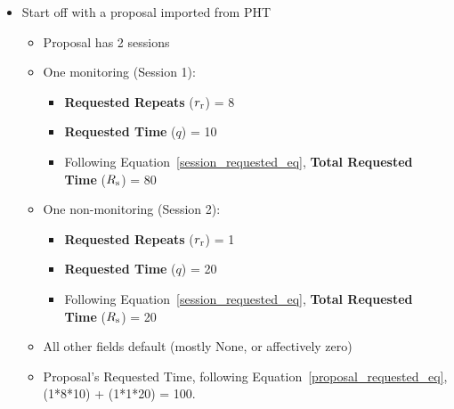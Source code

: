\documentclass{article}
\begin{document}
\begin{itemize}
\item Start off with a proposal imported from PHT
    \begin{itemize}
    \item Proposal has 2 sessions
    \item One monitoring (Session 1): 
        \begin{itemize}
        \item {\bf Requested Repeats} ($r_{\rm r}$) = 8
        \item {\bf Requested Time} ($q$) = 10
        \item Following Equation~\ref{session_requested_eq}, {\bf Total Requested Time} ($R_{\rm s}$) = 80
        \end{itemize}
     \item One non-monitoring (Session 2): 
         \begin{itemize}
         \item {\bf Requested Repeats} ($r_{\rm r}$) = 1
         \item {\bf Requested Time} ($q$) = 20
         \item Following Equation~\ref{session_requested_eq}, {\bf Total Requested Time} ($R_{\rm s}$) = 20
         \end{itemize}
     \item All other fields default (mostly None, or affectively zero)
     \item Proposal's Requested Time, following Equation~\ref{proposal_requested_eq}, (1*8*10) + (1*1*20) = 100.
         

\end{itemize}
\end{itemize}
\end{document}
